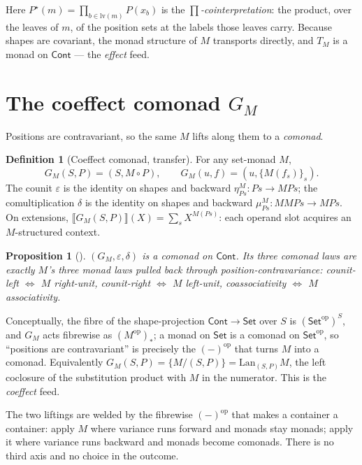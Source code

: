 \documentclass[11pt]{article}
\theoremstyle{plain}
\newtheorem{proposition}[theorem]{Proposition}
\theoremstyle{definition}
\newtheorem{definition}[theorem]{Definition}
\theoremstyle{remark}
\newcommand{\Set}{\mathsf{Set}}
\newcommand{\Cont}{\mathsf{Cont}}
\newcommand{\op}{\mathrm{op}}
\newcommand{\lv}{\mathrm{lv}}
\newcommand{\Ext}[1]{\llbracket #1\rrbracket}
\newcommand{\cont}[2]{(#1,#2)}
\begin{document}
Here $P^\star(m)=\prod_{b\in\lv(m)}P(x_b)$ is the \emph{$\prod$-cointerpretation}: the
product, over the leaves of $m$, of the position sets at the labels those leaves carry.
Because shapes are covariant, the monad structure of $M$ transports directly, and $T_M$
is a monad on $\Cont$ --- the \emph{effect} feed.

\section{The coeffect comonad $G_M$}\label{sec:coeffect}

Positions are contravariant, so the same $M$ lifts along them to a \emph{comonad}.

\begin{definition}[Coeffect comonad, transfer]\label{def:G}
For any set-monad $M$,
\[
  G_M\cont S P=\cont S{M\circ P},\qquad G_M(u,f)=(u,\{M(f_s)\}_s).
\]
The counit $\varepsilon$ is the identity on shapes and backward $\eta^M_{Ps}\colon
Ps\to MPs$; the comultiplication $\delta$ is the identity on shapes and backward
$\mu^M_{Ps}\colon MMPs\to MPs$. On extensions,
$\Ext{G_M(S,P)}(X)=\sum_{s}X^{M(Ps)}$: each operand slot acquires an $M$-structured
context.
\end{definition}

\begin{proposition}[{\cite[monad--comonad transfer note]{MacBethTransfer}}]\label{prop:G}
$(G_M,\varepsilon,\delta)$ is a comonad on $\Cont$. Its three comonad laws are exactly
$M$'s three monad laws pulled back through position-contravariance: counit-left
$\Leftrightarrow$ $M$ right-unit, counit-right $\Leftrightarrow$ $M$ left-unit,
coassociativity $\Leftrightarrow$ $M$ associativity.
\end{proposition}

Conceptually, the fibre of the shape-projection $\Cont\to\Set$ over $S$ is
$(\Set^\op)^S$, and $G_M$ acts fibrewise as $(M^\op)_*$; a monad on $\Set$ is a comonad
on $\Set^\op$, so ``positions are contravariant'' is precisely the $(-)^\op$ that turns
$M$ into a comonad. Equivalently $G_M(S,P)=\{M/(S,P)\}=\mathrm{Lan}_{(S,P)}M$, the
left coclosure of the substitution product with $M$ in the numerator. This is the
\emph{coeffect} feed.

The two liftings are welded by the fibrewise $(-)^\op$ that makes a container a
container: apply $M$ where variance runs forward and monads stay monads; apply it where
variance runs backward and monads become comonads. There is no third axis and no choice
in the outcome.
\end{document}
